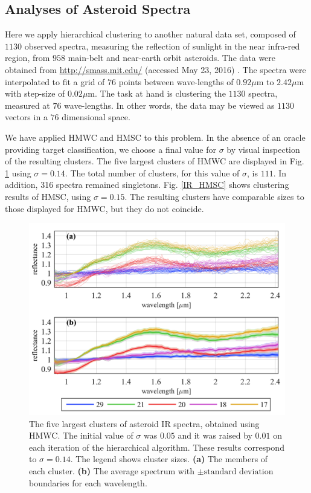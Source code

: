 \documentclass[preprint,12pt]{elsarticle}
\begin{document}
\subsection{Analyses of Asteroid Spectra}
\label{asteroid}
Here we apply hierarchical clustering to another natural data set, composed of $1130$ observed spectra, measuring the reflection of sunlight in the near infra-red region, from $958$ main-belt and near-earth orbit asteroids. The data were obtained from \url{http://smass.mit.edu/} (accessed May 23, 2016) \cite{binzel2001,binzel2004,rivkin2004,rayner2003}. The spectra were interpolated to fit a grid of $76$ points between wave-lengths of $0.92\mu \textrm{m}$ to $2.42\mu \textrm{m}$ with step-size of $0.02\mu \textrm{m}$. The task at hand is clustering the $1130$ spectra, measured at $76$ wave-lengths. In other words, the data may be viewed as $1130$ vectors in a $76$ dimensional space.

We have applied HMWC and HMSC to this problem. In the absence of an oracle providing target classification, we choose a final value for $\sigma$ by visual inspection of the resulting clusters. The five largest clusters of HMWC are displayed in Fig. \ref{IR_HMWC} using $\sigma=0.14$. The total number of clusters, for this value of $\sigma$, is $111$. In addition, 316 spectra remained singletons. Fig. \ref{IR_HMSC} shows clustering results of HMSC, using $\sigma=0.15$. The resulting clusters have comparable sizes to those displayed for HMWC, but they do not coincide.

\begin{figure}[tb]
\centering
\includegraphics[width=0.6\linewidth]{fig4.png}
\caption{ The five largest clusters of asteroid IR spectra, obtained using HMWC. The initial value of $\sigma$ was $0.05$ and it was raised by $0.01$ on each iteration of the hierarchical algorithm. These results correspond to $\sigma=0.14$. The legend shows cluster sizes. \textbf{(a)}  The members of each cluster. \textbf{(b)} The average spectrum with $\pm\textrm{standard deviation}$ boundaries for each wavelength.}
\label{IR_HMWC}
\end{figure}
\end{document}
